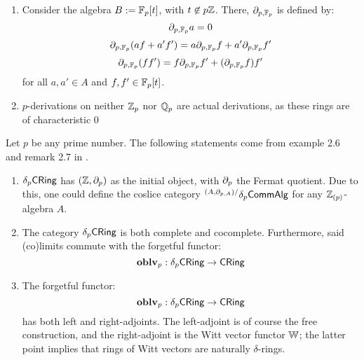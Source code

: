                     \begin{example} \label{example: p_derivations_and_derivations}
                        \noindent
                        \begin{enumerate}
                            \item Consider the algebra $B := \mathbb{F}_p[t]$, with $t \not \in p\mathbb{Z}$. There, $\partial_{p, \mathbb{F}_p}$ is defined by:
                                $$\partial_{p, \mathbb{F}_p}a = 0$$
                                $$\partial_{p, \mathbb{F}_p}(af + a'f') = a\partial_{p, \mathbb{F}_p}f + a'\partial_{p, \mathbb{F}_p}f'$$
                                $$\partial_{p, \mathbb{F}_p}(ff') = f\partial_{p, \mathbb{F}_p}f' + (\partial_{p, \mathbb{F}_p}f) f'$$
                            for all $a, a' \in A$ and $f, f' \in \mathbb{F}_p[t]$.
                            \item $p$-derivations on neither $\mathbb{Z}_p$ nor $\mathbb{Q}_p$ are actual derivations, as these rings are of characteristic $0$ 
                        \end{enumerate}
                    \end{example}
                     
                    \begin{proposition} \label{prop: (co)limits_of_delta_rings}
                        Let $p$ be any prime number. The following statements come from example 2.6 and remark 2.7 in \cite{bhatt_scholze_prisms}.
                        \begin{enumerate}
                            \item $\delta_p\mathsf{CRing}$ has $(\mathbb{Z}, \partial_p)$ as the initial object, with $\partial_p$ the Fermat quotient. Due to this, one could define the coslice category ${}^{(A, \partial_{p,A})/}\delta_p\mathsf{Comm}\mathsf{Alg}$ for any $\mathbb{Z}_{(p)}$-algebra $A$. 
                            \item The category $\delta_p\mathsf{CRing}$ is both complete and cocomplete. Furthermore, said (co)limits commute with the forgetful functor:
                                $$\mathbf{oblv}_p: \delta_p\mathsf{CRing} \to \mathsf{CRing}$$
                            \item The forgetful functor:
                                $$\mathbf{oblv}_p: \delta_p\mathsf{CRing} \to \mathsf{CRing}$$
                            has both left and right-adjoints. The left-adjoint is of course the free construction, and the right-adjoint is the Witt vector functor $\mathbb{W}$; the latter point implies that rings of Witt vectors are naturally $\delta$-rings.
                        \end{enumerate}
                    \end{proposition}
                    
